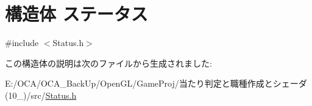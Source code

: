 \hypertarget{struct_xE3_x82_xB9_xE3_x83_x86_xE3_x83_xBC_xE3_x82_xBF_xE3_x82_xB9}{\section{構造体 ステータス}
\label{struct_xE3_x82_xB9_xE3_x83_x86_xE3_x83_xBC_xE3_x82_xBF_xE3_x82_xB9}
}


{\ttfamily \#include $<$Status.\-h$>$}



この構造体の説明は次のファイルから生成されました\-:\begin{DoxyCompactItemize}
\item 
E\-:/\-O\-C\-A/\-O\-C\-A\-\_\-\-Back\-Up/\-Open\-G\-L/\-Game\-Proj/当たり判定と職種作成とシェーダ(10\-\_)/src/\hyperlink{_status_8h}{Status.\-h}\end{DoxyCompactItemize}
